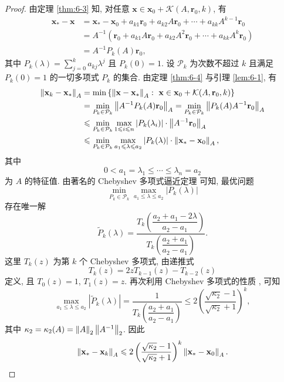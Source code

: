 \begin{proof}
由定理 \ref{thm:6-3} 知, 对任意 $\mathbf{x}\in\mathbf{x}_0+\mathcal{K}(A,\mathbf{r}_0,k)$, 有
\[
  \begin{aligned}
    \mathbf{x}_*-\mathbf{x}
    &=\mathbf{x}_*-\mathbf{x}_0+a_{k1}\mathbf{r}_0+a_{k2}A\mathbf{r}_0
      +\cdots+a_{kk}A^{k-1}\mathbf{r}_0\\
    &=A^{-1}\left(\mathbf{r}_0+a_{k1}A\mathbf{r}_0+a_{k2}A^2\mathbf{r}_0
      +\cdots+a_{kk}A^k\mathbf{r}_0\right)\\
    &=A^{-1}P_k(A)\mathbf{r}_0,
  \end{aligned}
\]
其中 $P_k(\lambda)=\sum_{j=0}^ka_{kj}\lambda^j$ 且 $P_k(0)=1$. 设 $\mathcal{P}_k$ 为次数不超过 $k$ 且满足 $P_k(0)=1$ 的一切多项式 $P_k$ 的集合. 由定理 \ref{thm:6-4} 与引理 \ref{lem:6-1}, 有
\begin{equation}
  \begin{aligned}
    \norm{\mathbf{x}_k-\mathbf{x}_*}_A
    &=\min\left\{\norm{\mathbf{x}-\mathbf{x}_*}_A:
      \ \mathbf{x}\in\mathbf{x}_0+\mathcal{K}(A,\mathbf{r}_0,k)\right\}\\
    &=\min_{P_k\in\mathcal{P}_k}\norm{A^{-1}P_k(A)\mathbf{r}_0}_A
     =\min_{P_k\in\mathcal{P}_k}\norm{P_k(A)A^{-1}\mathbf{r}_0}_A\\
    &\leqslant\min_{P_k\in\mathcal{P}_k}\max_{1\leqslant i\leqslant n}
      |P_k(\lambda_i)|\cdot\norm{A^{-1}\mathbf{r}_0}_A\\
    &\leqslant\min_{P_k\in\mathcal{P}_k}\max_{a_1\leqslant\lambda\leqslant a_2}
      |P_k(\lambda)|\cdot\norm{\mathbf{x}_*-\mathbf{x}_0}_A,
  \end{aligned}
  \label{eq:6-10}
\end{equation}
其中
\[
  0<a_1=\lambda_1\leqslant\cdots\leqslant\lambda_n=a_2
\]
为 $A$ 的特征值. 由著名的 Chebyshev 多项式逼近定理 \cite{src:70} 可知, 最优问题
\[
  \min_{P_k\in\mathcal{P}_k}\max_{a_1\leqslant\lambda\leqslant a_2}|P_k(\lambda)|
\]
存在唯一解
\[
  \widetilde{P}_k(\lambda)
  =\frac{T_k\left(\dfrac{a_2+a_1-2\lambda}{a_2-a_1}\right)}
  {T_k\left(\dfrac{a_2+a_1}{a_2-a_1}\right)}.
\]
这里 $T_k(z)$ 为第 $k$ 个 Chebyshev 多项式, 由递推式
\[
  T_k(z)=2zT_{k-1}(z)-T_{k-2}(z)
\]
定义, 且 $T_0(z)=1$, $T_1(z)=z$. 再次利用 Chebyshev 多项式的性质 \cite{src:70}, 可知
\begin{equation}
  \max_{a_1\leqslant\lambda\leqslant a_2}|\widetilde{P}_k(\lambda)|
  =\frac{1}{T_k\left(\dfrac{a_2+a_1}{a_2-a_1}\right)}
  \leqslant2\left(\frac{\sqrt{\kappa_2}-1}{\sqrt{\kappa_2}+1}\right)^k,
  \label{eq:6-11}
\end{equation}
其中 $\kappa_2=\kappa_2(A)=\left\|A\right\|_2\left\|A^{-1}\right\|_2$. 因此
\[
  \left\|\mathbf{x}_*-\mathbf{x}_k\right\|_A
  \leqslant2\left(\frac{\sqrt{\kappa_2}-1}{\sqrt{\kappa_2}+1}\right)^k
  \left\|\mathbf{x}_*-\mathbf{x}_0\right\|_A.
  \qedhere
\]
\end{proof}

